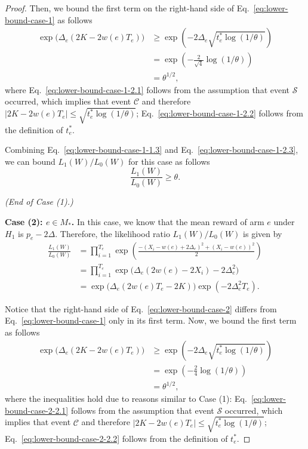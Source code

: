 \documentclass{article}
\begin{document}
\begin{spacing}{1.1}
\begin{proof}
Then, we bound the first term on the right-hand side of Eq.~\eqref{eq:lower-bound-case-1} as follows
\begin{align}
	\exp\big(\Delta_e(2K-2w(e)T_e)\big) & \ge \exp\left(-2\Delta_e\sqrt{t_e^*\log(1/\theta)}\right) \label{eq:lower-bound-case-1-2.1}\\
								       & = \exp\left(-\frac{2}{\sqrt{4}}\log(1/\theta)\right) \label{eq:lower-bound-case-1-2.2}\\
								       &=\theta^{1/2},  \label{eq:lower-bound-case-1-2.3}
\end{align}
where Eq.~\eqref{eq:lower-bound-case-1-2.1} follows from the assumption that event $\mathcal S$ occurred, which implies that event $\mathcal C$ and therefore $|2K-2w(e)T_e| \le \sqrt{t_e^*\log(1/\theta)}$; 
Eq.~\eqref{eq:lower-bound-case-1-2.2} follows from the definition of $t_e^*$.

Combining Eq.~\eqref{eq:lower-bound-case-1-1.3} and Eq.~\eqref{eq:lower-bound-case-1-2.3}, we can bound $L_1(W)/L_0(W)$ for this case as follows
\begin{equation}
\label{eq:ll-case1-final} 
\frac{L_1(W)}{L_0(W)} \ge \theta. 
\end{equation}


\emph{(End of Case (1).)}

\textbf{Case (2): $e\in M_*$.}
In this case, we know that the mean reward of arm $e$ under $H_1$ is $p_e-2\Delta$.
Therefore, the likelihood ratio $L_1(W)/L_0(W)$ is given by
\begin{align}
  \frac{L_1(W)}{L_0(W)} &= \prod_{i=1}^{T_e} \exp\left(\frac{-(X_i-w(e)+2\Delta_e)^2+(X_i-w(e))^2}{2}\right) \nonumber \\
  						&= \prod_{i=1}^{T_e} \exp\big(\Delta_e(2w(e)-2X_i)-2\Delta_e^2\big) \nonumber \\
  						&= \exp\big(\Delta_e(2w(e)T_e-2K)\big)\exp(-2\Delta_e^2T_e) \label{eq:lower-bound-case-2}.
\end{align}

Notice that the right-hand side of Eq.~\eqref{eq:lower-bound-case-2} differs from Eq.~\eqref{eq:lower-bound-case-1} only in its first term.
Now, we bound the first term as follows
\begin{align}
	\exp\big(\Delta_e(2K-2w(e)T_e)\big) & \ge \exp\left(-2\Delta_e\sqrt{t_e^*\log(1/\theta)}\right) \label{eq:lower-bound-case-2-2.1}\\
								       & = \exp\left(-\frac{2}{4}\log(1/\theta)\right) \label{eq:lower-bound-case-2-2.2}\\
								       &=\theta^{1/2},  \label{eq:lower-bound-case-2-2.3}
\end{align}
where the inequalities hold due to reasons similar to Case (1): Eq.~\eqref{eq:lower-bound-case-2-2.1} follows from the assumption that event $\mathcal S$ occurred, which implies that event $\mathcal C$ and therefore $|2K-2w(e)T_e| \le \sqrt{t_e^*\log(1/\theta)}$; 
Eq.~\eqref{eq:lower-bound-case-2-2.2} follows from the definition of $t_e^*$.


\end{proof}
\end{spacing}
\end{document}
